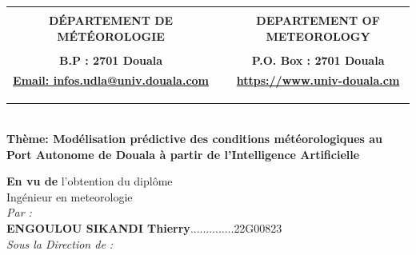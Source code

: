 \documentclass[a4paper,12pt]{article}
\begin{document}
\begin{titlepage}
\begin{adjustbox}{scale=0.6}
\begin{tabular}{ccc}
	\multicolumn{3}{c}{}\\
	\textbf{DÉPARTEMENT DE MÉTÉOROLOGIE} & & \textbf{DEPARTEMENT OF METEOROLOGY}\\
	
	\multicolumn{3}{c}{}\\
	\textbf{B.P : 2701 Douala} & & \textbf{P.O. Box : 2701 Douala} \\ 
	\textbf{\url{Email: infos.udla@univ.douala.com}} & & \textbf{\url{https://www.univ-douala.cm}} \\ 
	
	\multicolumn{3}{c}{}\\
	\multicolumn{3}{c}{}\\
	\multicolumn{3}{c}{}\\
	
\end{tabular}
\end{adjustbox}
\begin{center}
	\\
	{\LARGE \textbf{Thème: Modélisation prédictive des conditions météorologiques au Port Autonome de Douala à partir de l'Intelligence Artificielle}}\
	\noindent \normalsize {{\large \textbf{En vu de  }  } l'obtention du diplôme \\}
	\noindent \normalsize {Ingénieur en meteorologie  \\}
	\noindent \normalsize \textit{Par :\\}
	\vspace{\stretch{2}}
	\noindent \Large \textbf{ENGOULOU SIKANDI Thierry}..............\normalsize{22G00823} \\
	\vspace{\stretch{2}}
	\noindent \normalsize \textit{Sous la Direction de : \\}
	

\end{center}
\end{titlepage}
\end{document}
